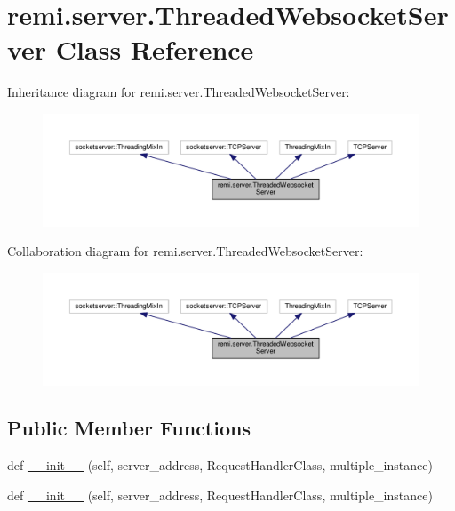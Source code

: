 \hypertarget{classremi_1_1server_1_1ThreadedWebsocketServer}{}\section{remi.\+server.\+Threaded\+Websocket\+Server Class Reference}
\label{classremi_1_1server_1_1ThreadedWebsocketServer}


Inheritance diagram for remi.\+server.\+Threaded\+Websocket\+Server\+:
\nopagebreak
\begin{figure}[H]
\begin{center}
\leavevmode
\includegraphics[width=350pt]{df/d01/classremi_1_1server_1_1ThreadedWebsocketServer__inherit__graph}
\end{center}
\end{figure}


Collaboration diagram for remi.\+server.\+Threaded\+Websocket\+Server\+:
\nopagebreak
\begin{figure}[H]
\begin{center}
\leavevmode
\includegraphics[width=350pt]{d6/d36/classremi_1_1server_1_1ThreadedWebsocketServer__coll__graph}
\end{center}
\end{figure}
\subsection*{Public Member Functions}
\begin{DoxyCompactItemize}
\item 
def \hyperlink{classremi_1_1server_1_1ThreadedWebsocketServer_ae513199dfefd66916e1ceb6dcc3da1b7}{\+\_\+\+\_\+init\+\_\+\+\_\+} (self, server\+\_\+address, Request\+Handler\+Class, multiple\+\_\+instance)
\item 
def \hyperlink{classremi_1_1server_1_1ThreadedWebsocketServer_ae513199dfefd66916e1ceb6dcc3da1b7}{\+\_\+\+\_\+init\+\_\+\+\_\+} (self, server\+\_\+address, Request\+Handler\+Class, multiple\+\_\+instance)
\end{DoxyCompactItemize}
